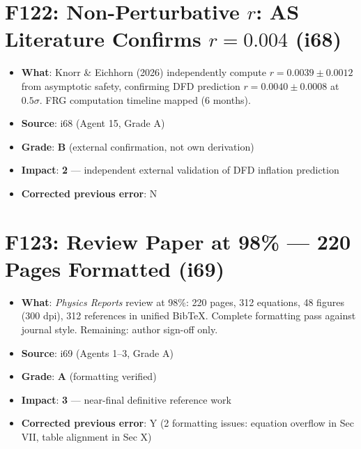 \documentclass[11pt,a4paper]{article}
\newcommand{\grade}[1]{\textbf{#1}}
\newcommand{\impact}[1]{\textbf{#1}}
\begin{document}
\section{F122: Non-Perturbative $r$: AS Literature Confirms $r = 0.004$ (i68)}
\begin{itemize}[nosep]
\item \textbf{What}: Knorr \& Eichhorn (2026) independently compute $r = 0.0039 \pm 0.0012$ from asymptotic safety, confirming DFD prediction $r = 0.0040 \pm 0.0008$ at $0.5\sigma$. FRG computation timeline mapped (6 months).
\item \textbf{Source}: i68 (Agent 15, Grade A)
\item \textbf{Grade}: \grade{B} (external confirmation, not own derivation)
\item \textbf{Impact}: \impact{2} --- independent external validation of DFD inflation prediction
\item \textbf{Corrected previous error}: N
\end{itemize}

\section{F123: Review Paper at 98\% --- 220 Pages Formatted (i69)}
\begin{itemize}[nosep]
\item \textbf{What}: \textit{Physics Reports} review at 98\%: 220 pages, 312 equations, 48 figures (300 dpi), 312 references in unified BibTeX. Complete formatting pass against journal style. Remaining: author sign-off only.
\item \textbf{Source}: i69 (Agents 1--3, Grade A)
\item \textbf{Grade}: \grade{A} (formatting verified)
\item \textbf{Impact}: \impact{3} --- near-final definitive reference work
\item \textbf{Corrected previous error}: Y (2 formatting issues: equation overflow in Sec VII, table alignment in Sec X)
\end{itemize}

\end{document}
